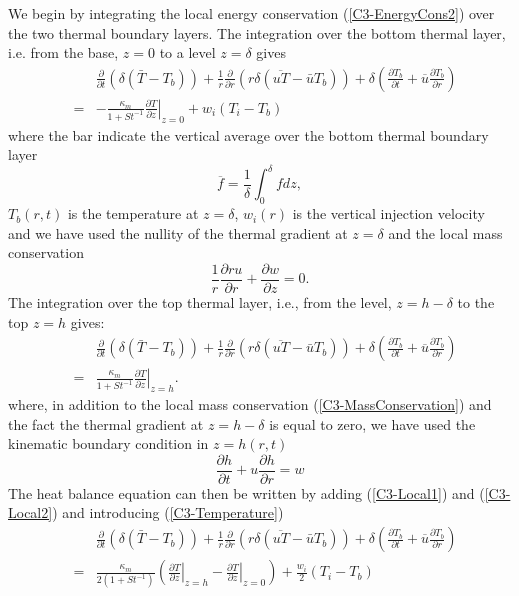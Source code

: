 We   begin    by   integrating    the   local    energy   conservation
(\ref{C3-EnergyCons2})  over  the  two   thermal  boundary  layers.   The
integration over the  bottom thermal layer, i.e. from  the base, $z=0$
to a level $z = \delta$ gives
\begin{eqnarray}
  &&\frac{\partial}{\partial t}\left( \delta( \bar{T}-T_b)\right)+\frac{1}{r}\frac{\partial}{\partial r} \left( r\delta(\overline{uT}-\bar{u}T_b)\right) + \delta\left( \frac{\partial T_b}{\partial t}+ \overline{u}\frac{\partial T_b}{\partial r}\right)\nonumber\\
  &=&-\frac{\kappa_m}{1+St^{-1}}\left. \frac{\partial T}{\partial z}\right|_{z=0}+w_{i}(T_{i}-T_b)
      \label{C3-Local1}
\end{eqnarray}
where the  bar indicate the  vertical average over the  bottom thermal
boundary layer
\begin{equation}
  \overline{f} = \frac{1}{\delta}\int_0^{\delta}f dz\nonumber,
\end{equation}
$T_b(r,t)$  is  the temperature  at  $z=\delta$,  $w_{i}(r)$ is  the
vertical  injection velocity  and  we  have used  the  nullity of  the
thermal gradient at $z=\delta$ and the local mass conservation
\begin{equation}
  \frac{1}{r}\frac{\partial ru}{\partial r} +\frac{\partial w}{\partial z}=0.
  \label{C3-MassConservation}
\end{equation}
The  integration over  the top  thermal layer,  i.e., from  the level,
$z=h-\delta$ to the top $z=h$ gives:
\begin{eqnarray}
  &&\frac{\partial}{\partial t}\left( \delta( \bar{T}-T_b)\right)+\frac{1}{r}\frac{\partial}{\partial r} \left( r\delta(\overline{uT}-\bar{u}T_b)\right) + \delta\left(\frac{\partial T_b}{\partial t}+ \overline{u}\frac{\partial T_b}{\partial r}\right)\nonumber\\
  &=&\frac{\kappa_m}{1+St^{-1}}\left. \frac{\partial T}{\partial z}\right|_{z=h}.
      \label{C3-Local2}
\end{eqnarray}
where,    in    addition    to    the    local    mass    conservation
(\ref{C3-MassConservation})  and   the  fact  the  thermal   gradient  at
$z=h-\delta$ is  equal to  zero, we have  used the  kinematic boundary
condition in $z=h(r,t)$
\begin{equation}
  \frac{\partial h}{\partial t} +u\frac{\partial h}{\partial
    r} = w
\end{equation}
The heat balance equation can then be written by adding (\ref{C3-Local1})
and (\ref{C3-Local2}) and introducing (\ref{C3-Temperature})
\begin{eqnarray}
  &&\frac{\partial}{\partial t}\left( \delta( \bar{T}-T_b)\right)+\frac{1}{r}\frac{\partial}{\partial r} \left( r\delta(\overline{uT}-\bar{u}T_b)\right) + \delta\left( \frac{\partial T_b}{\partial t}+ \overline{u}\frac{\partial T_b}{\partial r}\right)\nonumber\\
  &=&\frac{\kappa_m}{2(1+St^{-1})}\left(\left. \frac{\partial T}{\partial z}\right|_{z=h}-\left. \frac{\partial T}{\partial z}\right|_{z=0}\right)+\frac{w_{i}}{2}(T_{i}-T_b)
      \label{C3-LocalHeat3}
\end{eqnarray}

